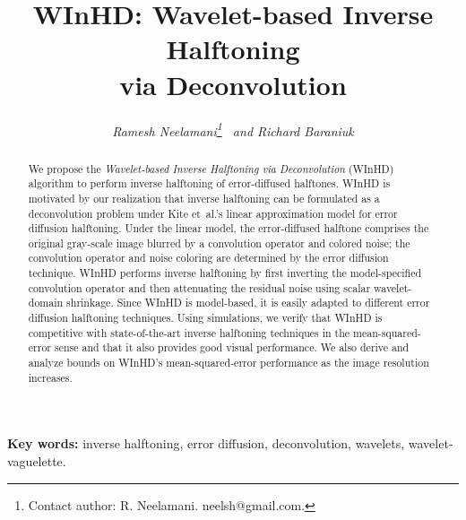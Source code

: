 \documentclass[11pt]{article}
\begin{document}
\begin{titlepage}


\title{\LARGE\bf \mbox{WInHD}: Wavelet-based Inverse
 Halftoning\\[-2mm] via Deconvolution\protect\\[-2mm]}
 \author{{\Large\it Ramesh Neelamani\thanks{Contact author: R. Neelamani. 
neelsh@gmail.com.}  ~and Richard
 Baraniuk} \\ 
 \date{}}

\maketitle 
\vspace*{-0mm}
\begin{abstract}
\small \noindent \sloppy We propose the {\em Wavelet-based Inverse
Halftoning via Deconvolution} (\mbox{WInHD}) algorithm to perform
inverse halftoning of error-diffused halftones. \mbox{WInHD} is
motivated by our realization that inverse halftoning can be formulated
as a deconvolution problem under Kite et~al.'s linear approximation
model for error diffusion halftoning. Under the linear model, the
error-diffused halftone comprises the original gray-scale image
blurred by a convolution operator and colored noise; the convolution
operator and noise coloring are determined by the error diffusion
technique.  \mbox{WInHD} performs inverse halftoning by first
inverting the model-specified convolution operator and then
attenuating the residual noise using scalar wavelet-domain
shrinkage. Since \mbox{WInHD} is model-based, it is easily adapted to
different error diffusion halftoning techniques.  Using simulations,
we verify that \mbox{WInHD} is competitive with state-of-the-art
inverse halftoning techniques in the mean-squared-error sense and that
it also provides good visual performance. We also derive and analyze
bounds on \mbox{WInHD}'s mean-squared-error performance as the image
resolution increases.
\end{abstract} 
\setcounter{page}{1} 
\setcounter{footnote}{0}
\vspace{10mm}
{\bf Key words:} inverse halftoning, error diffusion, deconvolution,  wavelets,
wavelet-vaguelette.

\thispagestyle{empty}
\end{titlepage}
\setcounter{page}{2} 
\def\acknowledgments{\vspace{1ex}\begin{center}{\Large\bf Acknowledgments}\end{center}
\vspace{-0.75ex}}
\end{document}
